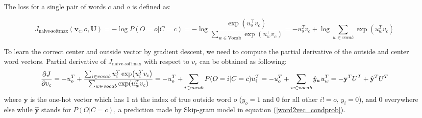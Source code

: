 \documentclass{assignment format}
\begin{document}
The loss for a single pair of words $c$ and $o$ is defined as:


\begin{equation}
 J_{\text{naive-softmax}}(\bm v_c, o, \bm U)=-\log P(O=o|C=c)= -\log\frac{\exp(u_{o}^\top v_c)}{\sum_{w \in \text{Vocab}} \exp( u_{w}^\top v_c)}=-u_o^T v_c+\log\sum_{w\in vocab}\exp(u_w^Tv_c)
\label{loss}
\end{equation}


To learn the correct center and outside vector by gradient descent, we need to compute the partial derivative of the outside and center word vectors. Partial derivative of $J_{\text{naive-softmax}}$ with respect to $v_c$ can be obtained as following:
\begin{equation}
\frac{\partial J}{\partial v_c}= -u_o^T+\frac{\sum_{i\in vocab} u_i^T\exp(u_i^Tv_c)}{\sum_{w\in vocab}\exp(u_w^Tv_c)}\\
=-u_o^T+\sum_{i\in vocab}P(O=i|C=c)u_i^T\\= -u_o^T+\sum_{w \in vocab}\hat{y}_wu_w^T\\
= -\mathbf{y}^TU^T+\hat{\mathbf{y}}^TU^T
\label{partial v_c}
\end{equation}where $\mathbf{y}$ is the one-hot vector which has 1 at the index of true outside word $o$ ($y_o=1$ and 0 for all other $i!=o$, $y_i=0$), and 0 everywhere else while $\hat{\mathbf{y}}$ stands for $P(O|C=c)$, a prediction made by Skip-gram model in equation (\ref{word2vec_condprob}).
\end{document}
